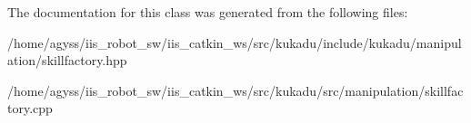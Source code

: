 The documentation for this class was generated from the following files\+:\begin{DoxyCompactItemize}
\item 
/home/agyss/iis\+\_\+robot\+\_\+sw/iis\+\_\+catkin\+\_\+ws/src/kukadu/include/kukadu/manipulation/skillfactory.\+hpp\item 
/home/agyss/iis\+\_\+robot\+\_\+sw/iis\+\_\+catkin\+\_\+ws/src/kukadu/src/manipulation/skillfactory.\+cpp\end{DoxyCompactItemize}
